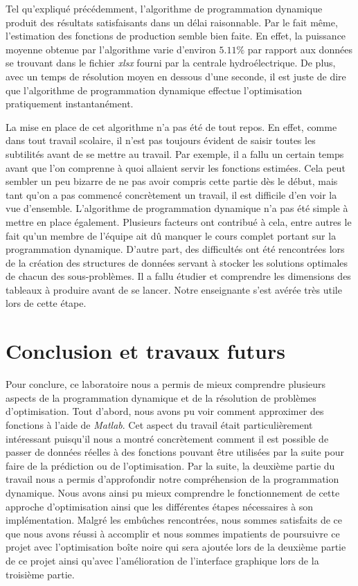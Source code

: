 \documentclass[12pt, letterpaper]{report}
\begin{document}
Tel qu'expliqué précédemment, l'algorithme de programmation dynamique produit des résultats satisfaisants dans un délai raisonnable.  Par le fait même, l'estimation des fonctions de production semble bien faite. En effet, la puissance moyenne obtenue par l'algorithme varie d'environ $5.11\%$ par rapport aux données se trouvant dans le fichier \textit{xlsx} fourni par la centrale hydroélectrique.  De plus, avec un temps de résolution moyen en dessous d'une seconde, il est juste de dire que l'algorithme de programmation dynamique effectue l'optimisation pratiquement instantanément.

La mise en place de cet algorithme n'a pas été de tout repos.  En effet, comme dans tout travail scolaire, il n'est pas toujours évident de saisir toutes les subtilités avant de se mettre au travail.  Par exemple, il a fallu un certain temps avant que l'on comprenne à quoi allaient servir les fonctions estimées.  Cela peut sembler un peu bizarre de ne pas avoir compris cette partie dès le début, mais tant qu'on a pas commencé concrètement un travail, il est difficile d'en voir la vue d'ensemble.  L'algorithme de programmation dynamique n'a pas été simple à mettre en place également.  Plusieurs facteurs ont contribué à cela, entre autres le fait qu'un membre de l'équipe ait dû manquer le cours complet portant sur la programmation dynamique.  D'autre part, des difficultés ont été rencontrées lors de la création des structures de données servant à stocker les solutions optimales de chacun des sous-problèmes.  Il a fallu étudier et comprendre les dimensions des tableaux à produire avant de se lancer.  Notre enseignante s'est avérée très utile lors de cette étape.

\chapter{Conclusion et travaux futurs}
Pour conclure, ce laboratoire nous a permis de mieux comprendre plusieurs aspects de la programmation dynamique et de la résolution de problèmes d'optimisation.  Tout d'abord, nous avons pu voir comment approximer des fonctions à l'aide de \textit{Matlab}.  Cet aspect du travail était particulièrement intéressant puisqu'il nous a montré concrètement comment il est possible de passer de données réelles à des fonctions pouvant être utilisées par la suite pour faire de la prédiction ou de l'optimisation.  Par la suite, la deuxième partie du travail nous a permis d'approfondir notre compréhension de la programmation dynamique. Nous avons ainsi pu mieux comprendre le fonctionnement de cette approche d'optimisation ainsi que les différentes étapes nécessaires à son implémentation.  Malgré les embûches rencontrées, nous sommes satisfaits de ce que nous avons réussi à accomplir et nous sommes impatients de poursuivre ce projet avec l'optimisation boîte noire qui sera ajoutée lors de la deuxième partie de ce projet ainsi qu'avec l'amélioration de l'interface graphique lors de la troisième partie.
\end{document}
